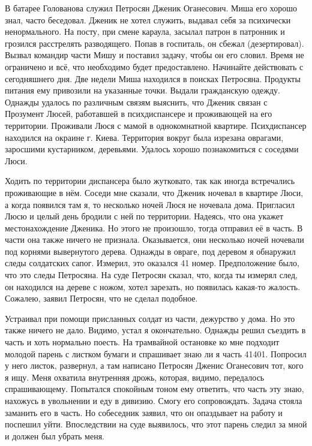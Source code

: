 В батарее Голованова служил Петросян Дженик Оганесович. Миша его хорошо знал, часто беседовал. Дженик не хотел служить, выдавал себя за психически ненормального. На посту, при смене караула, засылал патрон в патронник и грозился расстрелять разводящего. Попав в госпиталь, он сбежал (дезертировал). Вызвал командир части Мишу и поставил задачу, чтобы он его словил. Время не ограничено и всё, что необходимо будет предоставлено. Начинайте действовать с сегодняшнего дня. Две недели Миша находился в поисках Петросяна. Продукты питания ему привозили на указанные точки. Выдали гражданскую одежду. Однажды удалось по различным связям выяснить, что Дженик связан с Прозумент Люсей, работавшей в психдиспансере и проживающей на его территории. Проживали Люся с мамой в однокомнатной квартире. Психдиспансер находился на окраине г. Киева. Территория вокруг была изрезана оврагами, заросшими кустарником, деревьями. Удалось хорошо познакомиться с соседями Люси. 

Ходить по территории диспансера было жутковато, так как иногда встречались проживающие в нём. Соседи мне сказали, что Дженик ночевал в квартире Люси, а когда появился там я, то несколько ночей Люся не ночевала дома. Пригласил Люсю и целый день бродили с ней по территории. Надеясь, что она укажет местонахождение Дженика. Но этого не произошло, тогда отправил её в часть. В части она также ничего не признала. Оказывается, они несколько ночей ночевали под корнями вывернутого дерева. Однажды в овраге, под деревом я обнаружил следы солдатских сапог. Измерил, это оказался 41 номер. Предположение было, что это следы Петросяна. На суде Петросян сказал, что, когда ты измерял след, он находился на дереве с ножом, хотел зарезать, но появилась какая-то жалость. Сожалею, заявил Петросян, что не сделал подобное. 

Устраивал при помощи присланных солдат из части, дежурство у дома. Но это также ничего не дало. Видимо, устал я окончательно. Однажды решил съездить в часть и хоть нормально поесть. На трамвайной остановке ко мне подходит молодой парень с листком бумаги и спрашивает знаю ли я часть 41401. Попросил у него листок, развернул, а там написано Петросян Дженис Оганесович тот, кого я ищу. Меня охватила внутренняя дрожь, которая, видимо, передалось спрашивающему. Попытался спокойным тоном ему ответить, что часть эту знаю, нахожусь в увольнении и еду в дивизию. Смогу его сопровождать. Задача стояла заманить его в часть. Но собеседник заявил, что он опаздывает на работу и поспешил уйти. Впоследствии на суде выявилось, что этот парень следил за мной и должен был убрать меня. 

